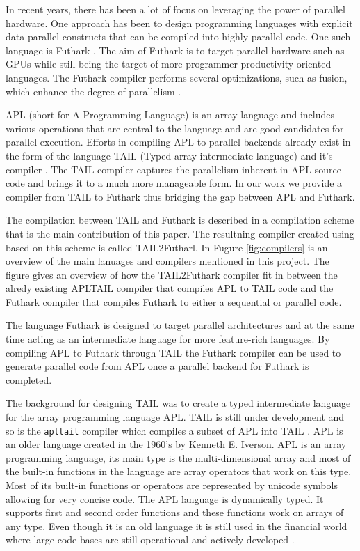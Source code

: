 \documentclass[11pt]{article}
\begin{document}
In recent years, there has been a lot of focus on leveraging the power of parallel hardware. 
One approach has been to design programming languages with explicit data-parallel constructs that can be compiled 
into highly parallel code. One such language is Futhark \cite{TroelsHenriksen}. The aim of Futhark is to target parallel hardware such as 
GPUs while still being the target of more programmer-productivity oriented languages. The Futhark compiler 
performs several optimizations, such as fusion, which enhance the degree of 
parallelism \cite{T.Henriksen&C.Oancea} \cite{T2graph} \cite{Hybrid}.

APL (short for A Programming Language) \cite{APLbook} is an array language and includes various operations that are central to the language and are good candidates 
for parallel execution. Efforts in compiling APL to parallel backends already exist in the form of the language 
TAIL (Typed array intermediate language) and it’s compiler \cite{ElsmanDybdal:Array:2014}.
The TAIL compiler captures the parallelism inherent in APL source code and brings it to a much more manageable form.
In our work we provide a compiler from TAIL 
to Futhark thus bridging the gap between APL and Futhark.

The compilation between TAIL and Futhark is described in a compilation scheme that is the main contribution of this paper. The resultning compiler created using based on this scheme is called TAIL2Futharl. 
In Fugure \ref{fig:compilers} is an overview of the main lanuages and compilers mentioned in this project. The figure gives an overview of how the TAIL2Futhark compiler fit in between the alredy existing APLTAIL compiler that compiles APL to TAIL code and the Futhark compiler that compiles Futhark to either a sequential or parallel code. 

The language Futhark is designed to target parallel architectures and at the same time acting 
as an intermediate language for more feature-rich languages. By compiling APL to Futhark through TAIL the 
Futhark compiler can be used to generate parallel code from APL once a parallel backend for 
Futhark is completed.

The background for designing TAIL was to create a typed intermediate language for the array programming language APL.
TAIL is still under development and so is the {\tt apltail} compiler which compiles a subset of APL into
TAIL \cite{ElsmanDybdal:Array:2014}.
APL is an older language created in the 1960's by Kenneth E. Iverson.
APL is an array programming language, its main type is the multi-dimensional array 
and most of the built-in functions in the language are array operators that work on this type. 
Most of its built-in functions or operators are represented by unicode symbols allowing for very concise code.
The APL language is dynamically typed. It supports first and second order functions and these functions work on arrays of any type. 
Even though it is an old language it is still used in the financial world 
where large code bases are still operational and actively developed \cite{ElsmanDybdal:Array:2014} \cite{Array:2015}.
\end{document}
